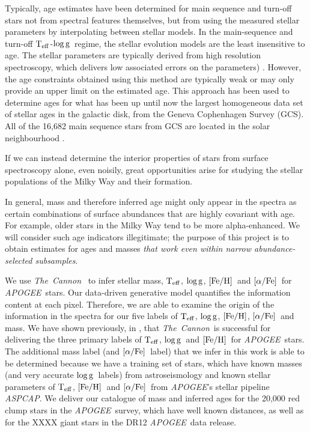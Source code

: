 \documentclass[12pt, preprint]{aastex}
\newcommand{\project}[1]{\textsl{#1}}
\newcommand{\tc}{\project{The~Cannon}}
\newcommand{\apogee}{\project{APOGEE}}
\newcommand{\aspcap}{\project{ASPCAP}}
\newcommand{\teff}{\mbox{$\rm T_{eff}$}}
\newcommand{\feh}{\mbox{$\rm [Fe/H]$}}
\newcommand{\alphafe}{\mbox{$\rm [\alpha/Fe]$}}
\newcommand{\logg}{\mbox{$\rm \log g$}}
\begin{document}
Typically, age estimates have been determined for main sequence and turn-off stars not from spectral features themselves, but from using the measured stellar parameters by interpolating between stellar models. In the main-sequence and turn-off \teff-\logg\ regime, the stellar evolution models are the least insensitive to age. The stellar parameters are typically derived from high resolution spectroscopy, which delivers low associated errors on the parameters) \citep[e.g.][]{Bensby2013, Casagrande2011, haywood2013}.   However, the age constraints obtained using this method are typically weak or may only provide an upper limit on the estimated age.  This approach has been used to determine ages for what has been up until now the largest homogeneous data set of stellar ages in the galactic disk, from the Geneva Cophenhagen Survey (GCS). All of the 16,682 main sequence stars from GCS are located in the solar neighbourhood \citep{nordstrom2004short}.

If we can instead determine the interior properties of stars from surface
spectroscopy alone, even noisily, great opportunities arise for
studying the stellar populations of the Milky Way and their formation. 

In general, mass and therefore inferred age might only appear in the spectra as
certain combinations of surface abundances that are highly covariant
with age.  For example, older stars in the Milky Way tend to be more
alpha-enhanced.  We will consider such age indicators illegitimate;
the purpose of this project is to obtain estimates for ages and masses \emph{that work even within narrow abundance-selected subsamples}.


We use \tc\  \citep{Ness2015} to infer stellar mass, \teff, \logg, \feh\ and \alphafe\ for \apogee\ stars.  Our data-driven generative model quantifies the information content at each pixel. Therefore, we are able to examine the origin of the information in the spectra for our five labels of \teff, \logg, \feh, \alphafe\ and mass. We have shown previously, in  \citet{Ness2015},  that \tc\ is successful for delivering the three primary labels of \teff, \logg\ and \feh\ for \apogee\ stars. The additional mass label (and \alphafe\ label) that we infer in this work is able to be determined because we have a training set of stars, which have known masses (and very accurate \logg\ labels) from astroseismology and known stellar parameters of \teff, \feh\ and \alphafe\ from \apogee's stellar pipeline \aspcap. We deliver our catalogue of mass and inferred ages for the 20,000 red clump stars in the \apogee\ survey, which have well known distances, as well as for the XXXX giant stars in the DR12 \apogee\ data release.
\end{document}
